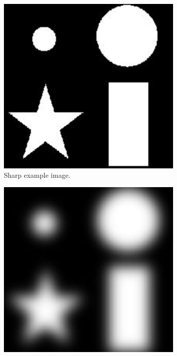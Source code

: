 \begin{figure}[H]
	\centering
	\begin{subfigure}[b]{0.35\linewidth}
		\centering
		\includegraphics[width=\linewidth]{Materials/E4/ex2sharp}
		\caption{Sharp example image.}
	\end{subfigure}
	\hspace{1.5cm}
	\begin{subfigure}[b]{0.35\linewidth}
		\centering
		\includegraphics[width=\linewidth]{Materials/E4/ex2blurred}

\end{subfigure}
\end{figure}
